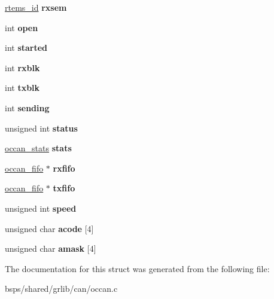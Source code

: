 \begin{DoxyCompactItemize}
\item 
\mbox{\label{structoccan__priv_a557fdd0bbf24c4daca116765248c8fe1}} 
\mbox{\hyperlink{group__ClassicTasks_gab20892b814dced7dd4e5b9bf42becd57}{rtems\+\_\+id}} {\bfseries rxsem}
\item 
\mbox{\label{structoccan__priv_a3709e40a977a4f86b36c374b024373ec}} 
int {\bfseries open}
\item 
\mbox{\label{structoccan__priv_a634be1d3a3bd41f69c4cd4db55fdf54a}} 
int {\bfseries started}
\item 
\mbox{\label{structoccan__priv_aa452f2f0c0d022942c107cf874da20a2}} 
int {\bfseries rxblk}
\item 
\mbox{\label{structoccan__priv_aff03cd34653b3b5433f3e52db569a9ec}} 
int {\bfseries txblk}
\item 
\mbox{\label{structoccan__priv_a2b32435a9653e540668deefc781ea1f0}} 
int {\bfseries sending}
\item 
\mbox{\label{structoccan__priv_af9b72eda579892d97202a6d101f35409}} 
unsigned int {\bfseries status}
\item 
\mbox{\label{structoccan__priv_a9abf099fd5adacb922b6fc2db7321356}} 
\mbox{\hyperlink{structoccan__stats}{occan\+\_\+stats}} {\bfseries stats}
\item 
\mbox{\label{structoccan__priv_a115b87b69a75c89d584048d1c4886896}} 
\mbox{\hyperlink{structoccan__fifo}{occan\+\_\+fifo}} $\ast$ {\bfseries rxfifo}
\item 
\mbox{\label{structoccan__priv_a035ae7e249ac598b59a9a46298295295}} 
\mbox{\hyperlink{structoccan__fifo}{occan\+\_\+fifo}} $\ast$ {\bfseries txfifo}
\item 
\mbox{\label{structoccan__priv_ae1990d4d6d902ed250322c533b1a052f}} 
unsigned int {\bfseries speed}
\item 
\mbox{\label{structoccan__priv_a2f1a6d42ec04432c67fa7a6e31ac6a0d}} 
unsigned char {\bfseries acode} \mbox{[}4\mbox{]}
\item 
\mbox{\label{structoccan__priv_a878f089f3c76b455ae9951772a74fc92}} 
unsigned char {\bfseries amask} \mbox{[}4\mbox{]}
\end{DoxyCompactItemize}


The documentation for this struct was generated from the following file\+:\begin{DoxyCompactItemize}
\item 
bsps/shared/grlib/can/occan.\+c\end{DoxyCompactItemize}
